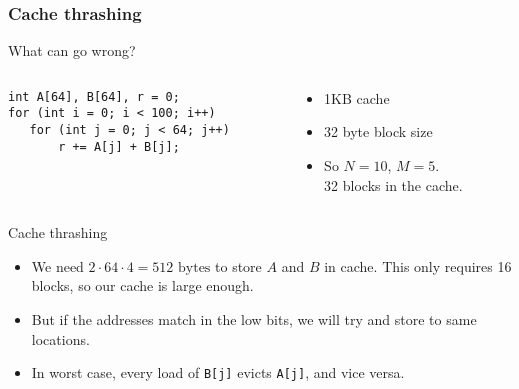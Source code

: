 \documentclass[presentation,aspectratio=43,10pt]{beamer}
\begin{document}
\begin{frame}[fragile]
  \frametitle{Cache thrashing}
  \begin{block}{What can go wrong?}
    \begin{columns}
      \begin{column}{0.45\textwidth}
\begin{verbatim}
int A[64], B[64], r = 0;
for (int i = 0; i < 100; i++)
   for (int j = 0; j < 64; j++)
       r += A[j] + B[j];
\end{verbatim}
      \end{column}
      \begin{column}{0.45\textwidth}
        \begin{itemize}
        \item 1KB cache
        \item 32 byte block size
        \item So $N=10$, $M=5$. \\32 blocks in the cache.
        \end{itemize}
      \end{column}
    \end{columns}
  \end{block}

  \begin{block}{Cache thrashing}
    \begin{itemize}
    \item We need $2 \cdot 64 \cdot 4 = 512\text{ bytes}$ to store $A$
      and $B$ in cache.  This only requires 16 blocks, so our cache is
      large enough.
    \item But if the addresses match in the low bits, we will try and
      store to same locations.
    \item In worst case, every load of \texttt{B[j]} evicts
      \texttt{A[j]}, and vice versa.
    \end{itemize}
  \end{block}
\end{frame}
\end{document}
